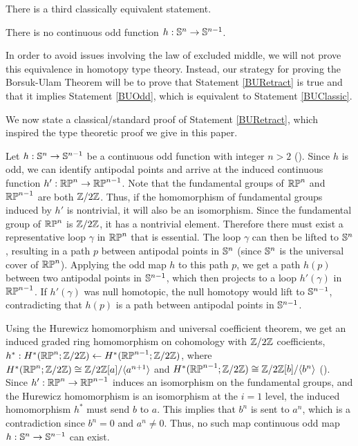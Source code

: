 \documentclass{amsart}
\begin{document}
There is a third classically equivalent statement.
\begin{statement}\label{BURetract}
There is no continuous odd function $h:\mathbb{S}^n \rightarrow \mathbb{S}^{n-1}$.
\end{statement}

In order to avoid issues involving the law of excluded middle, we will not prove this equivalence in homotopy type theory. Instead, our strategy for proving the Borsuk-Ulam Theorem will be to prove that Statement \ref{BURetract} is true and that it implies Statement \ref{BUOdd}, which is equivalent to Statement \ref{BUClassic}. 

We now state a classical/standard proof of Statement \ref{BURetract}, which inspired the type theoretic proof we give in this paper. 



 Let $h:\mathbb{S}^n \rightarrow \mathbb{S}^{n-1}$ be a continuous odd function with integer $n>2$ (). Since $h$ is odd, we can identify antipodal points and arrive at the induced continuous function $h':\mathbb{RP}^n\rightarrow\mathbb{RP}^{n-1}$. Note that the fundamental groups of $\mathbb{RP}^n$ and $\mathbb{RP}^{n-1}$ are both $\mathbb{Z}/2\mathbb{Z}$. 
 Thus, if the homomorphism of fundamental groups induced by $h'$ is nontrivial, it will also be an isomorphism.
 Since the fundamental group of $\mathbb{RP}^n$ is $\mathbb{Z}/2\mathbb{Z}$, it has a nontrivial element. Therefore there must exist a representative loop $\gamma$ in $\mathbb{RP}^n$ that is essential. The loop $\gamma$ can then be lifted to $\mathbb{S}^n$, resulting in a path $p$ between antipodal points in $\mathbb{S}^n$ (since $\mathbb{S}^n$ is the universal cover of $\mathbb{RP}^n$). Applying the odd map $h$ to this path $p$, we get a path $h(p)$ between two antipodal points in $\mathbb{S}^{n-1}$, which then projects to a loop $h'(\gamma)$ in $\mathbb{RP}^{n-1}$. If $h'(\gamma)$ was null homotopic, the null homotopy would lift to $\mathbb{S}^{n-1}$, contradicting that $h(p)$ is a path between antipodal points in $\mathbb{S}^{n-1}$. 
 
  Using the Hurewicz homomorphism and universal coefficient theorem, we get an induced graded ring homomorphism on cohomology with $\mathbb{Z}/2\mathbb{Z}$ coefficients, $h^*:H^*(\mathbb{RP}^n;\mathbb{Z}/2\mathbb{Z})\leftarrow H^*(\mathbb{RP}^{n-1};\mathbb{Z}/2\mathbb{Z})$, where $H^*(\mathbb{RP}^n;\mathbb{Z}/2\mathbb{Z})\cong \mathbb{Z}/2\mathbb{Z}[a]/\langle a^{n+1}\rangle$ and $H^*(\mathbb{RP}^{n-1};\mathbb{Z}/2\mathbb{Z})\cong \mathbb{Z}/2\mathbb{Z}[b]/\langle b^n\rangle$ ().  Since $h':\mathbb{RP}^n\rightarrow\mathbb{RP}^{n-1}$ induces an isomorphism on the fundamental groups, and the Hurewicz homomorphism is an isomorphism at the $i=1$ level, the induced homomorphism $h^*$ must send $b$ to $a$. This implies that $b^n$ is sent to $a^n$, which is a contradiction since $b^n=0$ and $a^n\neq 0$.  Thus, no such map continuous odd map $h:\mathbb{S}^n \rightarrow \mathbb{S}^{n-1}$ can exist.  
 
\end{document}
